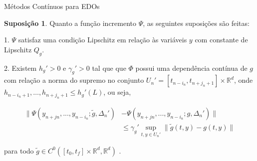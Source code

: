 \documentclass{beamer}
\newcommand{\R}{\mathbb{R}}
\theoremstyle{plain}
\theoremstyle{definition}
\newtheorem{assumption}{Suposição}
\begin{document}
\begin{frame}{Métodos Contínuos para EDOs}
    \begin{assumption}
        \label{chap3:assumption:1:Psi}
        \small
        Quanto a função incremento $\Psi$, as seguintes suposições são feitas:

        \phantom{aa} 1. $\Psi$ satisfaz uma condição Lipschitz em relação às variáveis $y$ com constante de Lipschitz $Q_g$.


        \phantom{aa} 2. Existem $h_g'>0$ e $\gamma_g' > 0$  tal que que $\Phi$ possui uma dependência contínua de $g$ com relação a norma do supremo no conjunto $U_n ' = [t_{n-i_n}, t_{n+j_n + 1}] \times \R^d$, onde $h_{n - i_n + 1 }, \dots, h_{n+j_n + 1} \leq h_g' (L)$, ou seja, 

        \scriptsize
            \begin{equation}
                \begin{split}
                    \| \Psi(y_{n + jn}, ..., y_{n - i_n}; \tilde{g}, \Delta_n ')  &- \Psi(y_{n + jn}, ..., y_{n - i_n}; g , \Delta_n ') \| \\
           &\leq \gamma_g ' \sup_{t, y \in U_n '} \| \tilde{g}(t, y) - g(t, y) \|
                \end{split}
                \label{chap3:assumption:point_lipschitz}
            \end{equation}

        para todo $\tilde{g} \in C^0([t_0, t_f] \times \R^d, \R^d)$ . 

    \end{assumption}

\end{frame}


\end{document}
